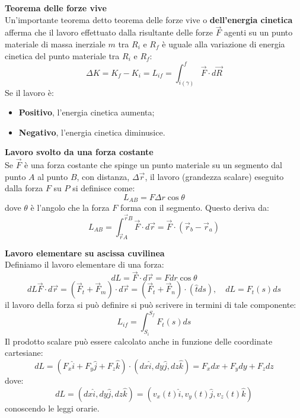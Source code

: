 \documentclass[a4paper,12pt]{article}
\begin{document}
\textbf{Teorema delle forze vive} \\
Un'importante teorema detto teorema delle forze vive o \textbf{dell'energia cinetica} afferma che il lavoro
effettuato dalla risultante delle forze $\vec{F}$ agenti su un punto materiale di massa inerziale $m$ tra
$R_i$ e $R_f$ è uguale alla variazione di energia cinetica del punto materiale tra $R_i$ e $R_f$:
$$ \Delta K = K_f - K_i = L_{if} = \int_{i (\gamma)}^f \vec{F} \cdot d\vec{R} $$
Se il lavoro è:
\begin{itemize}
  \item \textbf{Positivo}, l'energia cinetica aumenta;
  \item \textbf{Negativo}, l'energia cinetica diminusice.
\end{itemize}
\textbf{Lavoro svolto da una forza costante} \\
Se $\vec{F}$ è una forza costante che spinge un punto materiale su un segmento dal punto $A$ al punto $B$, con distanza,
$\Delta\vec{r}$, il lavoro (grandezza scalare) eseguito dalla forza $F$ su $P$ si definisce come:
$$ L_{AB} = F\Delta r\cos{\theta} $$
dove $\theta$ è l'angolo che la forza $F$ forma con il segmento. Questo deriva da:
$$ L_{AB} = \int_{\vec{r}A}^{\vec{r}B}\vec{F}\cdot d\vec{r} = \vec{F} \cdot (\vec{r}_b - \vec{r}_a) $$
\par\smallskip
\textbf{Lavoro elementare su ascissa cuvilinea} \\
Definiamo il lavoro elementare di una forza:
$$ dL = \vec{F} \cdot d\vec{r} = Fdr\cos{\theta} $$
$$ dL \vec{F} \cdot d\vec{r} = (\vec{F}_t + \vec{F}_m) \cdot d\vec{r} = (\vec{F}_t + \vec{F}_n) \cdot (\hat{t} ds), \quad dL = F_t(s) ds $$
il lavoro della forza si può definire si può scrivere in termini di tale componente: 
$$ L_{if} = \int_{S_i}^{S_f} F_t(s)ds $$
Il prodotto scalare può essere calcolato anche in funzione delle coordinate cartesiane:
$$ dL = (F_x\hat{i} + F_y\hat{j} + F_z\hat{k}) \cdot (dx \hat{i}, dy \hat{j}, dz \hat{k}) = F_xdx + F_ydy + F_zdz $$
dove:
$$ dL = (dx \hat{i}, dy \hat{j}, dz \hat{k}) = (v_x(t)\hat{i}, v_y(t)\hat{j}, v_z(t)\hat{k}) $$
conoscendo le leggi orarie.
\end{document}
